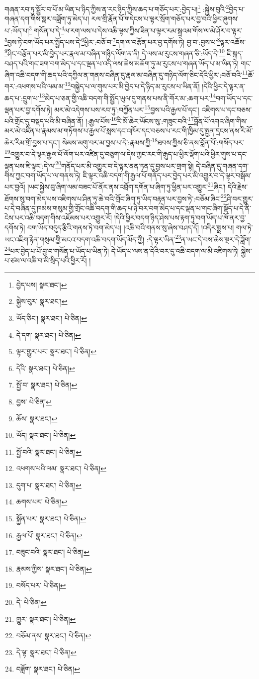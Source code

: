 གཞན་རབ་ཏུ་སྦྱོར་བ་པོ་མ་ཡིན་པ་ཉིད་ཀྱིས་ན་རང་ཉིད་ཀྱིས་ཆད་པ་གཅོད་པར་:བྱེད་པ།\footnote{བྱེད་པས།  སྣར་ཐང་། } :སྐྱེས་བུའི་\footnote{སྐྱེས་བུར་  སྣར་ཐང་། }བྱེད་པ་གཞན་དག་གིས་སླར་བཟློག་ཏུ་མེད་པ། རལ་གྲི་རྣོན་པོ་གདེངས་པ་ལྟར་སྲོག་གཅོད་པར་བྱ་བའི་ཕྱིར་ཞུགས་པ་:ཡོད་པ།\footnote{ཡོད་ཅིང་།  སྣར་ཐང་།  པེ་ཅིན། } གསོན་པ་དེ་\footnote{དེ་དག་  སྣར་ཐང་།  པེ་ཅིན། }ལ་རག་ལས་པ་དེས་འཆི་ལྟས་ཀྱིས་ཟིན་པ་ལྟར་རམ་སྐྲའམ་གོས་ལ་མེ་ཤོར་བ་ལྟར་\footnote{ལྟར་གྱུར་པར་  སྣར་ཐང་།  པེ་ཅིན། }བྱས་ཏེ་བག་ཡོད་པར་སྤྱོད་པས་དེ་\footnote{དེའི་  སྣར་ཐང་།  པེ་ཅིན། }ཕྱིར་:བཅོ་བ་\footnote{སྤྱོ་བ་  སྣར་ཐང་།  པེ་ཅིན། }དག་ལ་བརྩོན་པར་བྱ་དགོས་ཏེ། བྱ་བ་:བྱས་པ་\footnote{བྱས་  པེ་ཅིན། }ལྟར་འཆོས་\footnote{ཆོས་  སྣར་ཐང་། }ཤིང་བརྩོན་པར་མི་བྱེད་པར་རྣལ་མ་བཞིན་གཉིད་ལོག་ན་ནི། དེ་ལས་མ་རུངས་གཞན་ཅི་:ཡོད་དེ།\footnote{ཡོད།  སྣར་ཐང་།  པེ་ཅིན། } ཇི་སྐད་བཤད་པའི་གང་ཟག་བག་མེད་པ་དང་ལྡན་པ་འདི་ལས་ཆེས་མཆོག་ཏུ་མ་རུངས་པ་གཞན་ཡོད་པ་མ་ཡིན་ཏེ། གང་ཞིག་འཆི་བདག་གི་ཆད་པའི་དཀྱིལ་ན་གནས་བཞིན་དུ་རྣལ་མ་བཞིན་དུ་གཉིད་ལོག་ཅིང་དེའི་ཕྱིར་:བཅོ་བའི་\footnote{སྤྱོ་བའི་  སྣར་ཐང་།  པེ་ཅིན། }ཆོ་གར་:འཕགས་པའི་ལམ་མ་\footnote{འཕགས་པའི་ལམ་  སྣར་ཐང་།  པེ་ཅིན། }བསྐྱེད་པ་ལ་གུས་པར་མི་བྱེད་པ་དེ་ཉིད་མ་རུངས་པ་ཡིན་ནོ། །དེའི་ཕྱིར་དེ་ལྟར་ན་ཆད་པ་:དྲུག་པ་\footnote{དུག་པ་  སྣར་ཐང་།  པེ་ཅིན། }མེད་པ་ཅན་གྱི་འཆི་བདག་གི་སྤྱོད་ཡུལ་དུ་གནས་པས་ནི་གོར་མ་:ཆག་པར་\footnote{ཆགས་པར་  པེ་ཅིན། }བག་ཡོད་པ་དང་ལྡན་པར་བྱ་དགོས་ཏེ། མར་མེ་འདེགས་པས་རབ་ཏུ་:བཀྱོན་པར་\footnote{སྐྱོན་པར་  སྣར་ཐང་།  པེ་ཅིན། }བྱས་པའི་རྒྱལ་པོ་དང་། འཇིགས་པ་དང་བཅས་པའི་གྲོང་དུ་བསྡད་པའི་མི་བཞིན་ནོ། །:རྒྱལ་པོས་\footnote{རྒྱལ་པོ་  སྣར་ཐང་།  པེ་ཅིན། }རི་མོ་ཆེར་ཡོངས་སུ་:གཟུང་བའི་\footnote{བཟུང་བའི་  སྣར་ཐང་།  པེ་ཅིན། }བློན་པོ་འགའ་ཞིག་གིས་མར་མེ་འཛིན་པ་རྣམས་མ་གཏོགས་པ་རྒྱལ་པོ་སླས་དང་འཁོར་དང་བཅས་པ་རང་གི་ཁྱིམ་དུ་སྤྱན་དྲངས་ནས་རི་མོ་ཆེར་རིམ་གྲོ་བྱས་པ་དང་། སེམས་མགུ་བར་མ་བྱས་པ་དེ་:རྣམས་ཀྱི་\footnote{རྣམས་ཀྱིས་  སྣར་ཐང་།  པེ་ཅིན། }ཐབས་ཀྱིས་ཅི་ནས་བློན་པོ་:གསོད་པར་\footnote{བསོད་པར་  པེ་ཅིན། }འགྱུར་བ་དེ་ལྟར་རྒྱལ་པོ་ལོག་པར་འཛིན་དུ་བཅུག་ལ་དེས་ཀྱང་རང་གི་རྒུད་པ་ཕྱིར་ལྡོག་པའི་ཕྱིར་གུས་པ་དང་ལྡན་པས་ཇི་ལྟར་:དེ་ལ་\footnote{དེ་  པེ་ཅིན། }གནོད་པར་མི་འགྱུར་བ་དེ་ལྟར་ནན་ཏན་དུ་བྱས་པར་གྲག་སྟེ། དེ་བཞིན་དུ་གཞན་དག་གིས་ཀྱང་བག་ཡོད་པ་ལ་གནས་ཏེ། ཇི་ལྟར་འཆི་བདག་གི་རྒྱལ་པོ་གནོད་པར་བྱེད་པར་མི་འགྱུར་བ་དེ་ལྟར་བསྒོམ་པར་བྱའོ། །ཡང་སྐྱེས་བུ་ཞིག་ལམ་བཟང་པོ་ནོར་ནས་འབྲོག་དགོན་པ་ཞིག་ཏུ་ཕྱིན་པར་འགྱུར་\footnote{གྱུར་  སྣར་ཐང་།  པེ་ཅིན། }ཞིང་། དེའི་རྗེས་ཐོགས་སུ་བག་མེད་པས་འཇིགས་པ་ཤིན་ཏུ་ཆེ་བའི་གྲོང་ཞིག་ཏུ་ཡིད་བརྟན་པར་བྱས་ཏེ་:བཅོམ་ཞིང་\footnote{བཅོམ་ནས་  སྣར་ཐང་།  པེ་ཅིན། }ཤི་བར་གྱུར་པ་དེ་བཞིན་དུ་ཁམས་གསུམ་གྱི་གྲོང་འཆི་བདག་གི་ཆད་པ་ཉེ་བར་བག་མེད་པ་དང་ལྡན་པ་གང་ཞིག་སྡོད་པ་དེ་ནི་ངེས་པར་འཆི་བདག་གིས་འཇོམས་པར་འགྱུར་རོ། །དེའི་ཕྱིར་བདག་ཉིད་ཤེས་པས་རྟག་ཏུ་བག་ཡོད་པ་ཁོ་ནར་བྱ་དགོས་ཏེ། བག་ཡོད་བདུད་རྩིའི་གནས་ཏེ་བག་མེད་པ། །འཆི་བའི་གནས་སུ་ཞེས་བཤད་དོ། །འདིར་སྨྲས་པ། གལ་ཏེ་ཡང་འཇིག་རྟེན་གསུམ་གྱི་མངའ་བདག་འཆི་བདག་ཡོད་མོད་ཀྱི། :དེ་ལྟར་ཡིན་\footnote{དེ་ལྟ་  སྣར་ཐང་།  པེ་ཅིན། }ན་ཡང་དེ་བས་ཆེས་སྔར་དེ་ཟློག་\footnote{བཟློག་  སྣར་ཐང་།  པེ་ཅིན། }པར་བྱེད་པ་པོ་བྱ་བ་གསོན་པ་ཡོད་པ་ཡིན་ཏེ། དེ་ཡོད་པ་ལས་ན་དེའི་བར་དུ་འཆི་བདག་ལ་མི་འཇིགས་ཏེ། སྐྱེས་པ་ཙམ་ལ་འཆི་བ་མི་སྲིད་པའི་ཕྱིར་རོ། །
